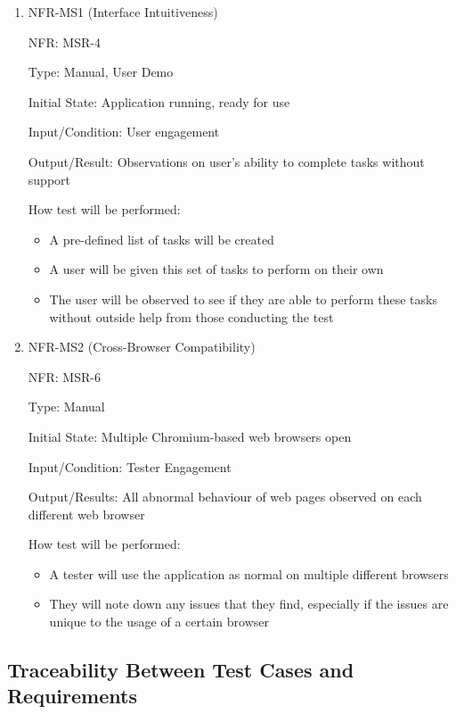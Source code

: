 \documentclass[12pt, titlepage]{article}
\begin{document}
\begin{enumerate}
\item{NFR-MS1 (Interface Intuitiveness)\\}

NFR: MSR-4 

Type: Manual, User Demo

Initial State: Application running, ready for use

Input/Condition: User engagement

Output/Result: Observations on user's ability to complete tasks without support

How test will be performed: 
\begin{itemize}
  \item  A pre-defined list of tasks will be created 
  \item A user will be given this set of tasks to perform on their own
  \item The user will be observed to see if they are able to perform these tasks
  without outside help from those conducting the test 
\end{itemize}
					
\item{NFR-MS2 (Cross-Browser Compatibility)\\}

NFR: MSR-6

Type: Manual

Initial State: Multiple Chromium-based web browsers open

Input/Condition: Tester Engagement

Output/Results: All abnormal behaviour of web pages observed on each different
web browser

How test will be performed: 
\begin{itemize}
  \item A tester will use the application as normal on multiple different
  browsers
  \item They will note down any issues that they find, especially if the issues
  are unique to the usage of a certain browser
\end{itemize}
\end{enumerate}

\subsection{Traceability Between Test Cases and Requirements}
\end{document}
